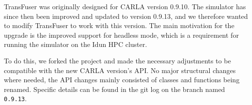 TransFuser was originally designed for CARLA version 0.9.10.
The simulator has since then been improved and updated to version 0.9.13,
and we therefore wanted to modify TransFuser to work with this version.
The main motivation for the upgrade is the improved support for headless mode,
which is a requirement for running the simulator on the Idun HPC cluster.

To do this, we forked the project and made the necessary adjustments to be compatible with the new CARLA version's API.
No major structural changes where needed,
the API changes mainly consisted of classes and functions being renamed.
Specific details can be found in the git log on the branch named \texttt{0.9.13}.


